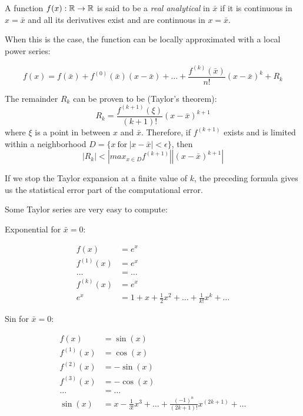 \documentclass[justified,sixbynine]{tufte-book}
\theoremstyle{plain}%
\theoremstyle{definition}
\theoremstyle{remark}
\begin{document}
\begin{fullwidth}

A function $f(x):{\Bbb R}\rightarrow{\Bbb R}$ is said to be a {\it real analytical} in $\bar x$ if it is continuous in $x=\bar x$ and all its derivatives exist and are continuous in $x=\bar x$.

When this is the case, the function can be locally approximated with a local power series:

\begin{equation}
f(x) = f(\bar x) + f^{(0)}(\bar x)(x-\bar x) + \dots + \frac{f^{(k)}(\bar x)}{n!}(x-\bar x)^k + R_k
\end{equation}

The remainder $R_k$ can be proven to be (Taylor's theorem):
\begin{equation}
R_k = \frac{f^{(k+1)}(\xi)}{(k+1)!}(x-\bar x)^{k+1}
\end{equation}
where $\xi$ is a point in between $x$ and $\bar x$. Therefore, if $f^{(k+1)}$ exists and is limited within a neighborhood $D = \{x~\textrm{for}~|x-\bar x|<\epsilon\}$, then
\begin{equation}
|R_k| < \left| max_{x\in D} f^{(k+1)} \right| |(x-\bar x)^{k+1}|
\end{equation}

If we stop the Taylor expansion at a finite value of $k$, the preceding formula gives us the statistical error part of the computational error.

Some Taylor series are very easy to compute:

Exponential for $\bar x = 0$:

\begin{align}
f(x) &= e^x \\
f^{(1)}(x) &= e^x \\
\dots &= \dots \\
f^{(k)}(x) &= e^x \\
e^x &=  1 + x + \frac12 x^2 + \dots + \frac1{k!}x^k +\dots 
\end{align}

Sin for $\bar x = 0$:

\begin{align}
f(x) &= \sin(x) \\
f^{(1)}(x) &= \cos(x) \\
f^{(2)}(x) &= -\sin(x) \\
f^{(3)}(x) &= -\cos(x) \\
\dots &= \dots \\
\sin(x) &=  x - \frac1{3!}x^3 + \dots + \frac{(-1)^n}{(2k+1)!}x^{(2k+1)} +\dots 
\end{align}


\end{fullwidth}
\end{document}
